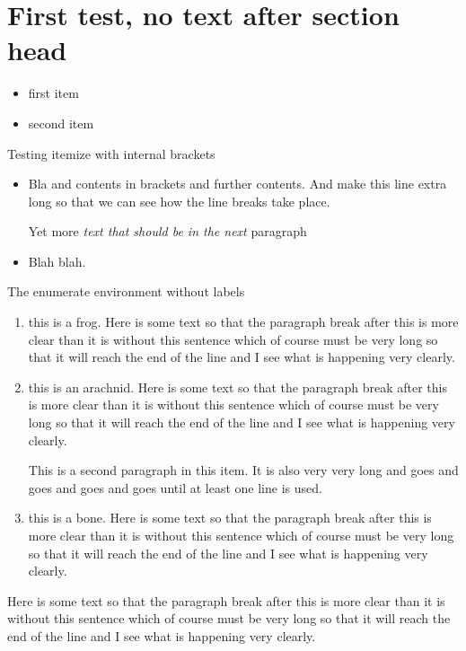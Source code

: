 \documentclass{article}
\begin{document}
\section{First test, no text after section head}
\begin{itemize}
\item first item
\item second item
\end{itemize}

Testing itemize with internal brackets
\begin{itemize}
\item Bla {and contents in brackets} and further contents.  And make this 
line extra long so that we can see how the line breaks take place.

Yet more {\it text that should be in the next} paragraph
\item Blah blah.
\end{itemize}

 The
enumerate environment without labels
\begin{enumerate}
\item this is a frog. Here is some text so that the paragraph break after this
is more clear than it is without this sentence which of
course must be very long so that it will reach the end of
the line and I see what is happening very clearly.
\item this is an arachnid. Here is some text so that the paragraph break after this
is more clear than it is without this sentence which of
course must be very long so that it will reach the end of
the line and I see what is happening very clearly.

This is a second paragraph in this item.  It is also
very very long and goes and goes and goes and goes until
at least one line is used.

\item this is a bone. Here is some text so that the paragraph break after this
is more clear than it is without this sentence which of
course must be very long so that it will reach the end of
the line and I see what is happening very clearly.
\end{enumerate}
Here is some text so that the paragraph break after this
is more clear than it is without this sentence which of
course must be very long so that it will reach the end of
the line and I see what is happening very clearly.
\end{document}
